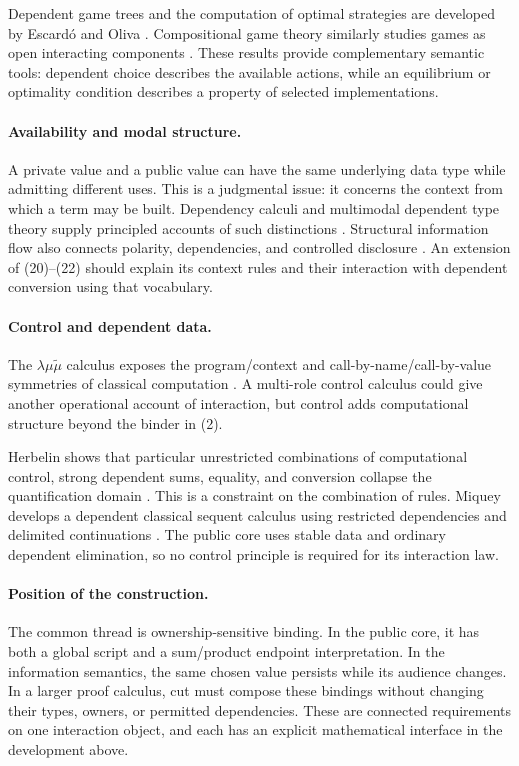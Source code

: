 Dependent game trees and the computation of optimal strategies are developed
by Escard\'o and Oliva \cite{EscardoOliva2023}. Compositional game theory
similarly studies games as open interacting components
\cite{GhaniEtAl2018}. These results provide complementary semantic tools:
dependent choice describes the available actions, while an equilibrium or
optimality condition describes a property of selected implementations.

\paragraph{Availability and modal structure.}
A private value and a public value can have the same underlying data type
while admitting different uses. This is a judgmental issue: it concerns the
context from which a term may be built. Dependency calculi and multimodal
dependent type theory supply principled accounts of such distinctions
\cite{ChoudhuryEadesWeirich2022,GratzerEtAl2021}. Structural information flow
also connects polarity, dependencies, and controlled disclosure
\cite{GouniEtAl2025}. An extension of (20)--(22) should explain its context
rules and their interaction with dependent conversion using that vocabulary.

\paragraph{Control and dependent data.}
The $\lambda\mu\tilde\mu$ calculus exposes the program/context and
call-by-name/call-by-value symmetries of classical computation
\cite{CurienHerbelin2000}. A multi-role control calculus could give another
operational account of interaction, but control adds computational structure
beyond the binder in (2).

Herbelin shows that particular unrestricted combinations of computational
control, strong dependent sums, equality, and conversion collapse the
quantification domain \cite{Herbelin2005}. This is a constraint on the
combination of rules. Miquey develops a dependent classical sequent calculus
using restricted dependencies and delimited continuations
\cite{Miquey2017}. The public core uses stable data and ordinary dependent
elimination, so no control principle is required for its interaction law.

\paragraph{Position of the construction.}
The common thread is ownership-sensitive binding. In the public core, it has
both a global script and a sum/product endpoint interpretation. In the
information semantics, the same chosen value persists while its audience
changes. In a larger proof calculus, cut must compose these bindings without
changing their types, owners, or permitted dependencies. These are connected
requirements on one interaction object, and each has an explicit mathematical
interface in the development above.
